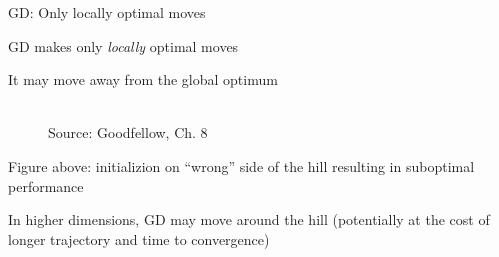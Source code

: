 \documentclass[11pt,compress,t,notes=noshow, xcolor=table]{beamer}
\begin{document}
\begin{frame} {GD: Only locally optimal moves}
\begin{itemize}
\small{
\item GD makes only \textit{locally} optimal moves
\item It may move away from the global optimum
\begin{figure}
	\centering
	\tiny{\\Source: Goodfellow, Ch. 8}
\end{figure}
\item Figure above: initializion on ``wrong'' side of the hill resulting in suboptimal performance
\item In higher dimensions, GD may move around the hill (potentially at the cost of longer trajectory and time to convergence)}
\end{itemize}
\end{frame}
\end{document}
